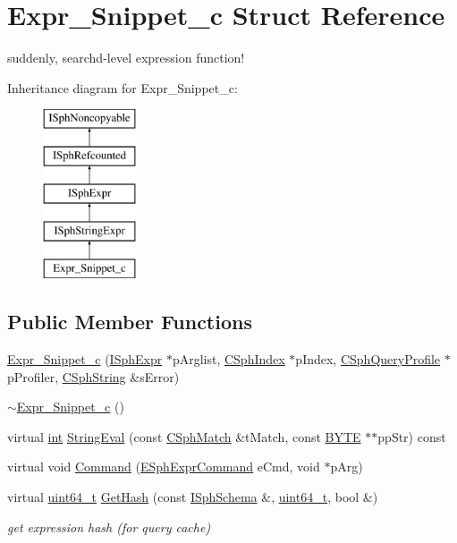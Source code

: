 \hypertarget{structExpr__Snippet__c}{\section{Expr\-\_\-\-Snippet\-\_\-c Struct Reference}
\label{structExpr__Snippet__c}
}


suddenly, searchd-\/level expression function!  


Inheritance diagram for Expr\-\_\-\-Snippet\-\_\-c\-:\begin{figure}[H]
\begin{center}
\leavevmode
\includegraphics[height=5.000000cm]{structExpr__Snippet__c}
\end{center}
\end{figure}
\subsection*{Public Member Functions}
\begin{DoxyCompactItemize}
\item 
\hyperlink{structExpr__Snippet__c_a0207b148da21b6083bc1dbab81558d52}{Expr\-\_\-\-Snippet\-\_\-c} (\hyperlink{structISphExpr}{I\-Sph\-Expr} $\ast$p\-Arglist, \hyperlink{classCSphIndex}{C\-Sph\-Index} $\ast$p\-Index, \hyperlink{classCSphQueryProfile}{C\-Sph\-Query\-Profile} $\ast$p\-Profiler, \hyperlink{structCSphString}{C\-Sph\-String} \&s\-Error)
\item 
\hyperlink{structExpr__Snippet__c_a07fe4ab42e9bf76599a3e421a0ea0fdb}{$\sim$\-Expr\-\_\-\-Snippet\-\_\-c} ()
\item 
virtual \hyperlink{sphinxexpr_8cpp_a4a26e8f9cb8b736e0c4cbf4d16de985e}{int} \hyperlink{structExpr__Snippet__c_aaa25db3c6857d34d8a2b03f2cfee1fa8}{String\-Eval} (const \hyperlink{classCSphMatch}{C\-Sph\-Match} \&t\-Match, const \hyperlink{sphinxstd_8h_a4ae1dab0fb4b072a66584546209e7d58}{B\-Y\-T\-E} $\ast$$\ast$pp\-Str) const 
\item 
virtual void \hyperlink{structExpr__Snippet__c_ad8d3eead6d630bae1cbdc9c702941486}{Command} (\hyperlink{sphinxexpr_8h_a30be184fb07bd80c271360fc6094c818}{E\-Sph\-Expr\-Command} e\-Cmd, void $\ast$p\-Arg)
\item 
virtual \hyperlink{sphinxstd_8h_aaa5d1cd013383c889537491c3cfd9aad}{uint64\-\_\-t} \hyperlink{structExpr__Snippet__c_adc4dbabf35a21f5582f9880e493dcbed}{Get\-Hash} (const \hyperlink{classISphSchema}{I\-Sph\-Schema} \&, \hyperlink{sphinxstd_8h_aaa5d1cd013383c889537491c3cfd9aad}{uint64\-\_\-t}, bool \&)
\begin{DoxyCompactList}\small\item\em get expression hash (for query cache) \end{DoxyCompactList}\end{DoxyCompactItemize}
